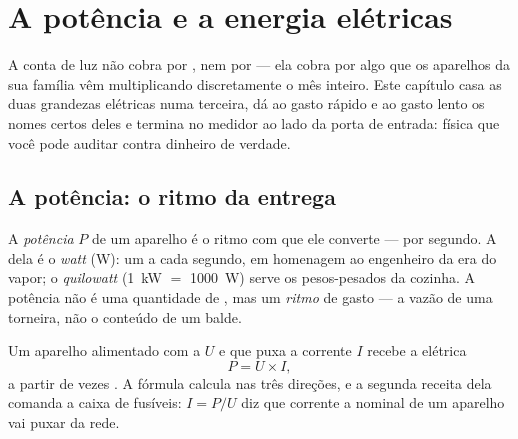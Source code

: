 \chapter{A potência e a energia elétricas}\label{ch:g9:electric-power-energy}

A conta de luz não cobra por , nem por  --- ela cobra por
algo que os aparelhos da sua família vêm multiplicando discretamente
o mês inteiro. Este capítulo casa as duas grandezas elétricas numa
terceira, dá ao gasto rápido e ao gasto lento os nomes certos deles e
termina no medidor ao lado da porta de entrada: física que você pode
auditar contra dinheiro de verdade.

\section{A potência: o ritmo da entrega}

\begin{definition}\label{def:g9:electric-power-energy:power}
A \emph{potência} $P$ de um aparelho é o ritmo com
que ele converte  ---  por segundo. A  dela é o
\emph{watt} (\unit{W}): um  a cada segundo, em
homenagem ao engenheiro da era do vapor; o \emph{quilowatt}
(\qty{1}{kW} $=$ \qty{1000}{W}) serve os pesos-pesados da cozinha. A
potência não é uma quantidade de , mas um \emph{ritmo} de
gasto --- a vazão de uma torneira, não o conteúdo de um balde.
\end{definition}

\begin{proposition}\label{prop:g9:electric-power-energy:UI}
Um aparelho alimentado com a  $U$ e que puxa a corrente $I$
recebe a  elétrica
\[
P = U \times I ,
\]
 a partir de  vezes . A fórmula calcula nas três
direções, e a segunda receita dela comanda a caixa de fusíveis:
$I = P/U$ diz que corrente a  nominal de um aparelho vai
puxar da rede.
\end{proposition}

